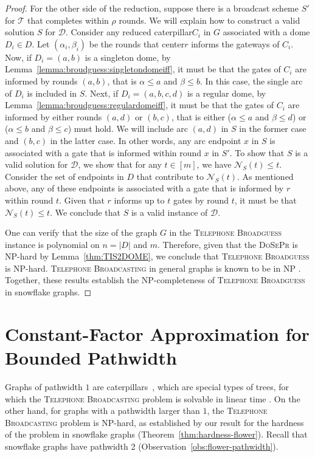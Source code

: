 \documentclass[letterpaper,11pt]{article}
\newcommand{\flower}{snowflake\xspace}
\newcommand{\pistil}{center\xspace}
\newcommand{\telebr}{\textsc{Telephone Broadcasting}\xspace}
\newcommand{\dspr}{\textsc{DoSePr}\xspace}
\newcommand{\cater}{reduced caterpillar\xspace}
\newcommand{\telebg}{\textsc{Telephone Broadguess}\xspace}
\begin{document}
\begin{proof}
For the other side of the reduction, suppose there is a broadcast scheme $S'$ for $\mathcal{T}$ that completes within $\rho$ rounds. We will explain how to construct a valid solution $S$ for $\mathcal{D}$. 
Consider any \cater $C_i$ in $G$ associated with a dome $D_i \in D$. 
Let $(\alpha_i,\beta_i)$ be the rounds that \pistil $r$ informs the gateways of $C_i$.
Now, if $D_i = (a,b)$ is a singleton dome, by Lemma~\ref{lemma:broudguess:singletondomeiff}, it must be that the gates of $C_i$ are informed by rounds $(a,b)$, that is $\alpha \leq a$ and $\beta \leq b$. In this case, the single arc of $D_i$ is included in $S$. 
Next, if $D_i = (a,b,c,d)$ is a regular dome, by Lemma~\ref{lemma:broudguess:regulardomeiff}, it must be that the gates of $C_i$ are informed by either rounds $(a,d)$ or $(b,c)$, that is either ($\alpha \leq a$ and $\beta \leq d$) or ($\alpha\leq b$ and $\beta \leq c$) must hold. 
We will include arc $(a,d)$ in $S$ in the former case and $(b,c)$ in the latter case. 
In other words, any arc endpoint $x$ in $S$ is associated with a gate that is informed within round $x$ in $S'$. 
To show that $S$ is a valid solution for $\mathcal{D}$, we show that for any $t\in [m]$, we have $\mathcal{N}_S(t) \leq t$. 
Consider the set of endpoints in $D$ that contribute to $\mathcal{N}_S(t)$. As mentioned above, any of these endpoints is associated with a gate that is informed by $r$ within round $t$. Given that $r$ informs up to $t$ gates by round $t$, it must be that $\mathcal{N}_S(t) \leq t$. 
We conclude that $S$ is a valid instance of $\mathcal{D}$. 

One can verify that the size of the graph $G$ in the \telebg instance is polynomial on $n=|D|$ and $m$. Therefore, given that the \dspr is NP-hard by  Lemma~\ref{thm:TIS2DOME}, we conclude that \telebg is NP-hard. \telebr in general graphs is known to be in NP \cite{slater1981nptree}. Together, these results establish the NP-completeness of \telebg in \flower graphs.
\end{proof}
  \section{Constant-Factor Approximation for Bounded Pathwidth}
\label{sec:pathwidth-approx}

Graphs of pathwidth $1$ are caterpillars~\cite{ProskurowskiT99}, which are special types of trees, for which the \telebr problem is solvable in linear time \cite{fraigniaud2002polynomial}. On the other hand, for graphs with a pathwidth larger than $1$, the \telebr problem is NP-hard, as established by our result for the hardness of the problem in \flower graphs (Theorem~\ref{thm:hardness-flower}). Recall that \flower graphs have pathwidth 2 (Observation~\ref{obs:flower-pathwidth}). 
\end{document}
